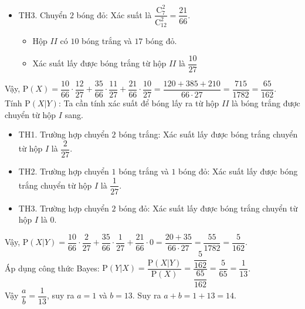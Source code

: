 \begin{ex}
{\begin{itemize}
			      \begin{itemize}
				      \item Hộp $II$ có $11$ bóng trắng và $16$ bóng đỏ.
				      \item Xác suất lấy được bóng trắng từ hộp $II$ là $\dfrac{11}{27}$
			      \end{itemize}
			\item TH3. Chuyển $2$ bóng đỏ: Xác suất là $\dfrac{\mathrm{C}_{7}^{2}}{\mathrm{C}_{12}^{2}} = \dfrac{21}{66}$.
			      \begin{itemize}
				      \item Hộp $II$ có $10$ bóng trắng và $17$ bóng đỏ.
				      \item Xác suất lấy được bóng trắng từ hộp $II$ là $\dfrac{10}{27}$
			      \end{itemize}
		\end{itemize}
		Vậy, $\mathrm{P}(X) = \dfrac{10}{66} \cdot \dfrac{12}{27} + \dfrac{35}{66} \cdot \dfrac{11}{27} + \dfrac{21}{66} \cdot \dfrac{10}{27} = \dfrac{120 + 385 + 210}{66 \cdot 27} = \dfrac{715}{1782} = \dfrac{65}{162}$.\\
		Tính $\mathrm{P}(X|Y)$: Ta cần tính xác suất để bóng lấy ra từ hộp $II$ là bóng trắng được chuyển từ hộp $I$ sang.
		\begin{itemize}
			\item TH1. Trường hợp chuyển $2$ bóng trắng: Xác suất lấy được bóng trắng chuyển từ hộp $I$ là $\dfrac{2}{27}$.
			\item TH2. Trường hợp chuyển $1$ bóng trắng và $1$ bóng đỏ: Xác suất lấy được bóng trắng chuyển từ hộp $I$ là $\dfrac{1}{27}$.
			\item TH3. Trường hợp chuyển $2$ bóng đỏ: Xác suất lấy được bóng trắng chuyển từ hộp $I$ là $0$.
		\end{itemize}
		Vậy, $\mathrm{P}(X|Y) = \dfrac{10}{66} \cdot \dfrac{2}{27} + \dfrac{35}{66} \cdot \dfrac{1}{27} + \dfrac{21}{66} \cdot 0 = \dfrac{20 + 35}{66 \cdot 27} = \dfrac{55}{1782} = \dfrac{5}{162}$.\\
		Áp dụng công thức Bayes: $\mathrm{P}(Y|X) = \dfrac{\mathrm{P}(X|Y)}{\mathrm{P}(X)} = \dfrac{\dfrac{5}{162}}{\dfrac{65}{162}} = \dfrac{5}{65} = \dfrac{1}{13}$.\\
		Vậy $\dfrac{a}{b} = \dfrac{1}{13}$, suy ra $a = 1$ và $b = 13$. Suy ra $a + b = 1 + 13 = 14$.
	}
\end{ex}

